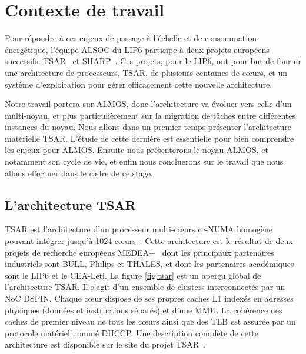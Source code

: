 \chapter{Contexte de travail}
\label{sec:context}

  Pour répondre à ces enjeux de passage à l'échelle et de consommation
  énergétique, l'équipe ALSOC du LIP6 participe à deux projets européens
  successifs: TSAR~\cite{tsar2008} et SHARP~\cite{sharp2012}. Ces projets, pour
  le LIP6, ont pour but de fournir une architecture de processeurs, TSAR, de
  plusieurs centaines de c\oe urs, et un système d'exploitation pour gérer
  efficacement cette nouvelle architecture.

  Notre travail portera sur ALMOS, donc l'architecture va évoluer vers celle
  d'un multi-noyau, et plus particulièrement sur la migration de tâches entre
  différentes instances du noyau. Nous allons dans un premier temps présenter
  l'architecture matérielle TSAR. L'étude de cette dernière est essentielle pour
  bien comprendre les enjeux pour ALMOS. Ensuite nous présenterons le noyau
  ALMOS, et notamment son cycle de vie, et enfin nous concluerons sur le travail
  que nous allons effectuer dans le cadre de ce stage.
  

  \section{L'architecture TSAR}
  \label{sec:tsar}

    TSAR est l'architecture d’un processeur multi-c\oe urs cc-NUMA homogène
    pouvant intégrer jusqu’à 1024 c\oe urs~\cite{greiner2009tsar}. Cette
    architecture est le résultat de deux projets de recherche européens
    MEDEA+~\cite{tsar2008,sharp2012} dont les principaux partenaires industriels
    sont BULL, Philips et THALES, et dont les partenaires académiques sont le
    LIP6 et le CEA-Leti. La figure \ref{fig:tsar} est un aperçu global de
    l'architecture TSAR. Il s'agit d'un ensemble de clusters interconnectés par
    un NoC
    DSPIN. Chaque c\oe ur dispose de ses propres caches L1 indexés en
    adresses physiques (données et instructions séparés) et d'une MMU. La
    cohérence des caches de premier niveau de tous les c\oe urs ainsi que des
    TLB est assurée par un protocole matériel nommé
    DHCCP. Une
    description complète de cette architecture est disponible sur le site du
    projet TSAR~\cite{tsar2008web}.

